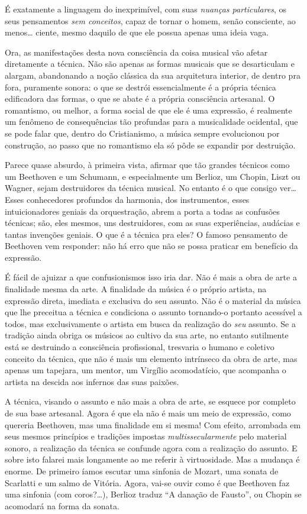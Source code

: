 É exatamente a linguagem do inexprimível, com suas \textit{nuanças
particulares}, os seus pensamentos \textit{sem conceitos}, capaz de tornar o
homem, senão consciente, ao menos\ldots{} ciente, mesmo daquilo de que ele
possua apenas uma ideia vaga.

Ora, as manifestações desta nova consciência da coisa musical vão afetar
diretamente a técnica. Não são apenas as formas musicais que se
desarticulam e alargam, abandonando a noção clássica da sua arquitetura
interior, de dentro pra fora, puramente sonora: o que se destrói
essencialmente é a própria técnica edificadora das formas, o que se
abate é a própria consciência artesanal. O romantismo, ou melhor, a
forma social de que ele é uma expressão, é realmente um fenômeno de
consequências tão profundas para a musicalidade ocidental, que se pode
falar que, dentro do Cristianismo, a música sempre evolucionou por
construção, ao passo que no romantismo ela só pôde se expandir por
destruição.

Parece quase absurdo, à primeira vista, afirmar que tão grandes técnicos
como um Beethoven e um Schumann, e especialmente um Berlioz, um Chopin,
Liszt ou Wagner, sejam destruidores da técnica musical. No entanto é o
que consigo ver\ldots{} Esses conhecedores profundos da harmonia, dos
instrumentos, esses intuicionadores geniais da orquestração, abrem a
porta a todas as confusões técnicas; são, eles mesmos, uns destruidores,
com as suas experiências, audácias e tantas invenções geniais. O que é a
técnica pra eles? O famoso pensamento de Beethoven vem responder: não há
erro que não se possa praticar em benefício da expressão.

É fácil de ajuizar a que confusionismos isso iria dar. Não é mais a obra
de arte a finalidade mesma da arte. A finalidade da música é o próprio
artista, na expressão direta, imediata e exclusiva do seu assunto. Não é
o material da música que lhe preceitua a técnica e condiciona o assunto
tornando-o portanto acessível a todos, mas exclusivamente o artista em
busca da realização do \textit{seu} assunto. Se a tradição ainda obriga os
músicos ao cultivo da sua arte, no entanto sutilmente está se destruindo
a consciência profissional, tresvaria o humano e coletivo conceito da
técnica, que não é mais um elemento intrínseco da obra de arte, mas
apenas um tapejara, um mentor, um Virgílio acomodatício, que acompanha o
artista na descida aos infernos das suas paixões.

A técnica, visando o assunto e não mais a obra de arte, se esquece por
completo de sua base artesanal. Agora é que ela não é mais um meio de
expressão, como quereria Beethoven, mas uma finalidade em si mesma! Com
efeito, arrombada em seus mesmos princípios e tradições impostas
\textit{multissecularmente} pelo material sonoro, a realização da técnica se
confunde agora com a realização do assunto. E sobre isto falarei mais
longamente ao me referir à virtuosidade. Mas a mudança é enorme. De
primeiro íamos escutar uma sinfonia de Mozart, uma sonata de Scarlatti e
um salmo de Vitória. Agora, vai-se ouvir como é que Beethoven faz uma
sinfonia (com coros?\ldots{}), Berlioz traduz ``A danação de Fausto'', ou Chopin
se acomodará na forma da sonata.

